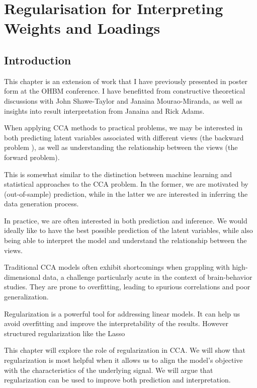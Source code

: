 \chapter{Regularisation for Interpreting Weights and Loadings}\label{chap:als}
\minitoc

\section{Introduction}\label{sec:introduction}

This chapter is an extension of work that I have previously presented in poster form at the OHBM conference.
I have benefitted from constructive theoretical discussions with John Shawe-Taylor and Janaina Mourao-Miranda, as well as insights into result interpretation from Janaina and Rick Adams.

When applying CCA methods to practical problems, we may be interested in both predicting latent variables associated
with different views (the backward problem \cite{haufe2014interpretation}), as well as understanding the relationship between the views (the forward problem).

This is somewhat similar to the distinction between machine learning and statistical approaches to the CCA problem.
In the former, we are motivated by (out-of-sample) prediction, while in the latter we are interested in inferring the
data generation process.

In practice, we are often interested in both prediction and inference. We would ideally like to have the best
possible prediction of the latent variables, while also being able to interpret the model and understand the
relationship between the views.

Traditional CCA models often exhibit shortcomings when grappling with high-dimensional data, a challenge particularly
acute in the context of brain-behavior studies. They are prone to overfitting, leading to spurious correlations and
poor generalization.

Regularization is a powerful tool for addressing linear models. It can help us avoid overfitting and improve the
interpretability of the results. However structured regularization like the Lasso

This chapter will explore the role of regularization in CCA. We will show that regularization is most helpful when it
allows us to align the model's objective with the characteristics of the underlying signal. We will argue that
regularization can be used to improve both prediction and interpretation.

